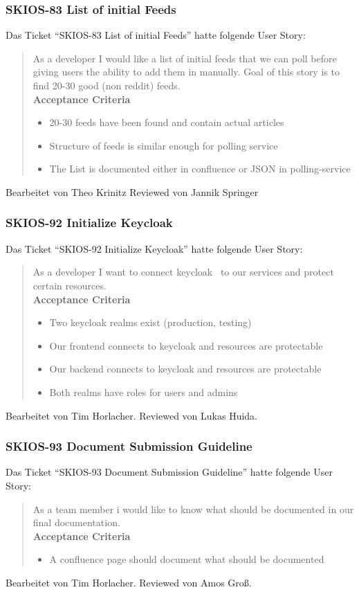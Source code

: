 \subsubsection{SKIOS-83 List of initial Feeds}
Das Ticket \enquote{SKIOS-83 List of initial Feeds} hatte folgende User Story:
\begin{quotation}
    As a developer I would like a list of initial feeds that we can poll before giving users the ability to add them in manually. 
    Goal of this story is to find 20-30 good (non reddit) feeds.\\
    \textbf{Acceptance Criteria}
    \begin{itemize}
        \item 20-30 feeds have been found and contain actual articles
        \item Structure of feeds is similar enough for polling service 
        \item The List is documented either in confluence or JSON in polling-service
    \end{itemize}
\end{quotation}
Bearbeitet von Theo Krinitz
Reviewed von Jannik Springer

\subsubsection{SKIOS-92 Initialize Keycloak}
Das Ticket \enquote{SKIOS-92 Initialize Keycloak} hatte folgende User Story:
\begin{quotation}
    As a developer I want to connect keycloak~\parencite{web/Keycloak} to our services and protect certain resources. \\
    \textbf{Acceptance Criteria}
    \begin{itemize}
        \item Two keycloak realms exist (production, testing)
        \item Our frontend connects to keycloak and resources are protectable
        \item Our backend connects to keycloak and resources are protectable
        \item Both realms have roles for users and admins
    \end{itemize}
\end{quotation}
Bearbeitet von Tim Horlacher.
Reviewed von Lukas Huida.

\subsubsection{SKIOS-93 Document Submission Guideline}
Das Ticket \enquote{SKIOS-93 Document Submission Guideline} hatte folgende User Story:
\begin{quotation}
    As a team member i would like to know what should be documented in our final documentation. \\
    \textbf{Acceptance Criteria}
    \begin{itemize}
        \item A confluence page should document what should be documented
    \end{itemize}
\end{quotation}
Bearbeitet von Tim Horlacher.
Reviewed von Amos Groß.

